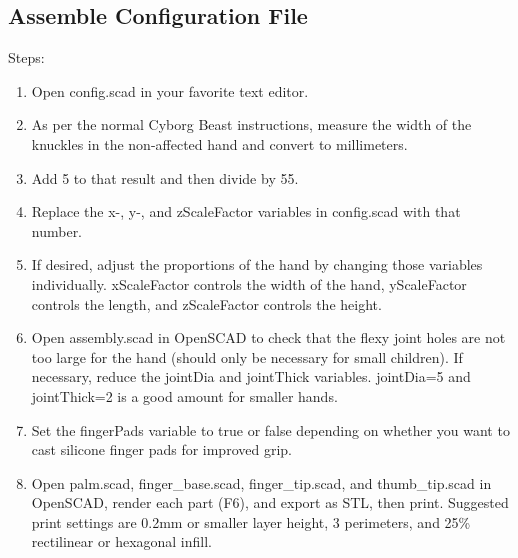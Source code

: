 \documentclass[11pt]{article}
\begin{document}
\subsection{Assemble Configuration File}Steps:
\begin{enumerate}
\item Open config.scad in your favorite text editor.
\item As per the normal Cyborg Beast instructions, measure the width of the knuckles in the non-affected hand and convert to millimeters.
\item Add 5 to that result and then divide by 55.
\item Replace the x-, y-, and zScaleFactor variables in config.scad with that number.
\item If desired, adjust the proportions of the hand by changing those variables individually. xScaleFactor controls the width of the hand, yScaleFactor controls the length, and zScaleFactor controls the height.
\item Open assembly.scad in OpenSCAD to check that the flexy joint holes are not too large for the hand (should only be necessary for small children). If necessary, reduce the jointDia and jointThick variables. jointDia=5 and jointThick=2 is a good amount for smaller hands.
\item Set the fingerPads variable to true or false depending on whether you want to cast silicone finger pads for improved grip.
\item Open palm.scad, finger\_base.scad, finger\_tip.scad, and thumb\_tip.scad in OpenSCAD, render each part (F6), and export as STL, then print. Suggested print settings are 0.2mm or smaller layer height, 3 perimeters, and 25\% rectilinear or hexagonal infill.
\end{enumerate}
\end{document}
